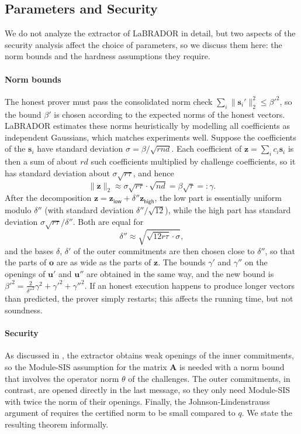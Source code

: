 \documentclass[../../book.tex]{subfiles}
\begin{document}
\subsection{Parameters and Security}\label{section:labrador-security}

We do not analyze the extractor of LaBRADOR in detail, but two aspects of the security analysis affect the choice of parameters, so we discuss them here: the norm bounds and the hardness assumptions they require.

\paragraph{Norm bounds}
The honest prover must pass the consolidated norm check $\sum_i \|\mathbf{s}_i'\|_2^2 \leq \beta'^2$, so the bound $\beta'$ is chosen according to the expected norms of the honest vectors.
LaBRADOR estimates these norms heuristically by modelling all coefficients as independent Gaussians, which matches experiments well.
Suppose the coefficients of the $\mathbf{s}_i$ have standard deviation $\sigma = \beta/\sqrt{rnd}$.
Each coefficient of $\mathbf{z} = \sum_i c_i\mathbf{s}_i$ is then a sum of about $rd$ such coefficients multiplied by challenge coefficients, so it has standard deviation about $\sigma\sqrt{r\tau}$, and hence
\begin{equation*}
    \|\mathbf{z}\|_2 \approx \sigma\sqrt{r\tau}\cdot\sqrt{nd} = \beta\sqrt{\tau} =: \gamma.
\end{equation*}
After the decomposition $\mathbf{z} = \mathbf{z}_{\mathsf{low}} + \delta''\mathbf{z}_{\mathsf{high}}$, the low part is essentially uniform modulo $\delta''$ (with standard deviation $\delta''/\sqrt{12}$), while the high part has standard deviation $\sigma\sqrt{r\tau}/\delta''$.
Both are equal for
\begin{equation*}
    \delta'' \approx \sqrt{\sqrt{12r\tau}\cdot \sigma},
\end{equation*}
and the bases $\delta$, $\delta'$ of the outer commitments are then chosen close to $\delta''$, so that the parts of $\mathbf{o}$ are as wide as the parts of $\mathbf{z}$.
The bounds $\gamma'$ and $\gamma''$ on the openings of $\mathbf{u}'$ and $\mathbf{u}''$ are obtained in the same way, and the new bound is $\beta'^2 = \frac{2}{\delta''^2}\gamma^2 + \gamma'^2 + \gamma''^2$.
If an honest execution happens to produce longer vectors than predicted, the prover simply restarts; this affects the running time, but not soundness.

\iffalse
\paragraph{Security}
As discussed in , the extractor obtains weak openings of the inner commitments, so the Module-SIS assumption for the matrix $\mathbf{A}$ is needed with a norm bound that involves the operator norm $\theta$ of the challenges.
The outer commitments, in contrast, are opened directly in the last message, so they only need Module-SIS with twice the norm of their openings.
Finally, the Johnson-Lindenstrauss argument of  requires the certified norm to be small compared to $q$.
We state the resulting theorem informally.
\end{document}
